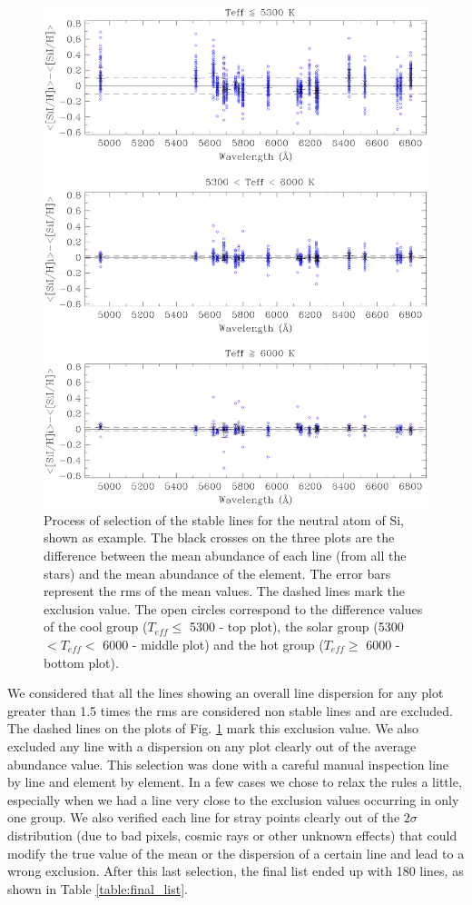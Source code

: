 \documentclass[oldversion]{aa}
\begin{document}
\begin{figure} [t]
\includegraphics[width=9 cm]{pics/delabgraySiI.eps}
\caption{Process of selection of the stable lines for the neutral atom of Si, shown as example. The black crosses on the three plots are the difference between the mean abundance of each line (from all the stars) and the mean abundance of the element. The error bars represent the rms of the mean values. The dashed lines mark the exclusion value. The open circles correspond to the difference values of the cool group ($T_{eff} \leq$ 5300 - top plot), the solar group (5300 $<T_{eff}<$ 6000 - middle plot) and the hot group ($T_{eff} \geq$ 6000 - bottom plot).}
\label{fig:line_select}
\end{figure}

We considered that all the lines showing an overall line dispersion for any plot greater than 1.5 times the rms  are considered non stable lines and are excluded. The dashed lines on the plots of Fig. \ref{fig:line_select} mark this exclusion value. We also excluded any line with a dispersion on any plot clearly out of the average abundance value. This selection was done with a careful manual inspection line by line and element by element. In a few cases we chose to relax the rules a little, especially when we had a line very close to the exclusion values occurring in only one group. We also verified each line for stray points clearly out of the $2\sigma$ distribution (due to bad pixels, cosmic rays or other unknown effects) that could modify the true value of the mean or the dispersion of a certain line and lead to a wrong exclusion. After this last selection, the final list ended up with 180 lines, as shown in Table \ref{table:final_list}. %
\end{document}
